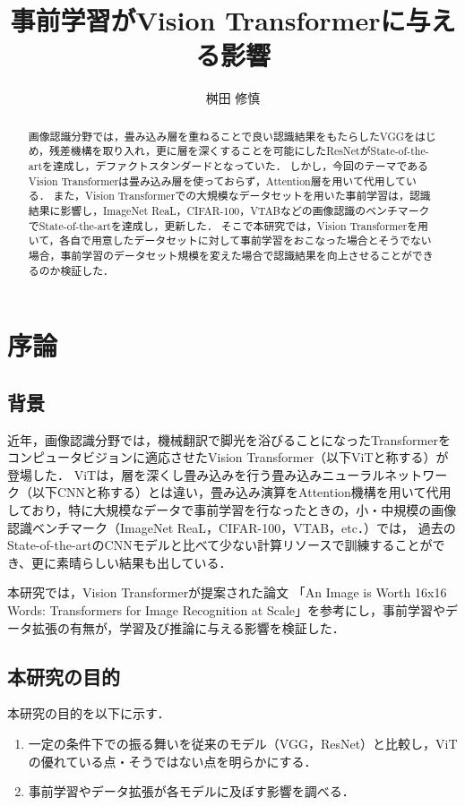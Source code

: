\documentclass[a4paper, oneside, openany, dvipdfmx]{suribt}%
\title{事前学習がVision Transformerに与える影響}
\author{桝田 修慎}
\begin{document}
\maketitle%

\frontmatter%
\begin{abstract}%
画像認識分野では，畳み込み層を重ねることで良い認識結果をもたらしたVGGをはじめ，残差機構を取り入れ，更に層を深くすることを可能にしたResNetがState-of-the-artを達成し，デファクトスタンダードとなっていた．
しかし，今回のテーマであるVision Transformerは畳み込み層を使っておらず，Attention層を用いて代用している．
また，Vision Transformerでの大規模なデータセットを用いた事前学習は，認識結果に影響し，ImageNet ReaL，CIFAR-100，VTABなどの画像認識のベンチマークでState-of-the-artを達成し，更新した．
そこで本研究では，Vision Transformerを用いて，各自で用意したデータセットに対して事前学習をおこなった場合とそうでない場合，事前学習のデータセット規模を変えた場合で認識結果を向上させることができるのか検証した．

\end{abstract}

\setcounter{tocdepth}{2}
\tableofcontents%

\mainmatter%
\chapter{序論}
\section{背景}
近年，画像認識分野では，機械翻訳で脚光を浴びることになったTransformer\cite{vaswani2017attention}をコンピュータビジョンに適応させたVision Transformer（以下ViTと称する）が登場した\cite{dosovitskiy2021image}．
ViTは，層を深くし畳み込みを行う畳み込みニューラルネットワーク（以下CNNと称する）とは違い，畳み込み演算をAttention機構を用いて代用しており，特に大規模なデータで事前学習を行なったときの，小・中規模の画像認識ベンチマーク（ImageNet ReaL，CIFAR-100，VTAB，etc．）では，
過去のState-of-the-artのCNNモデルと比べて少ない計算リソースで訓練することができ、更に素晴らしい結果も出している．

本研究では，Vision Transformerが提案された論文
「An Image is Worth 16x16 Words: Transformers for Image Recognition at Scale」を参考にし，事前学習やデータ拡張の有無が，学習及び推論に与える影響を検証した．
\section{本研究の目的}
本研究の目的を以下に示す．
\begin{enumerate}
  \item 一定の条件下での振る舞いを従来のモデル（VGG，ResNet）と比較し，ViTの優れている点・そうではない点を明らかにする．
  \item 事前学習やデータ拡張が各モデルに及ぼす影響を調べる．
\end{enumerate}
\end{document}

